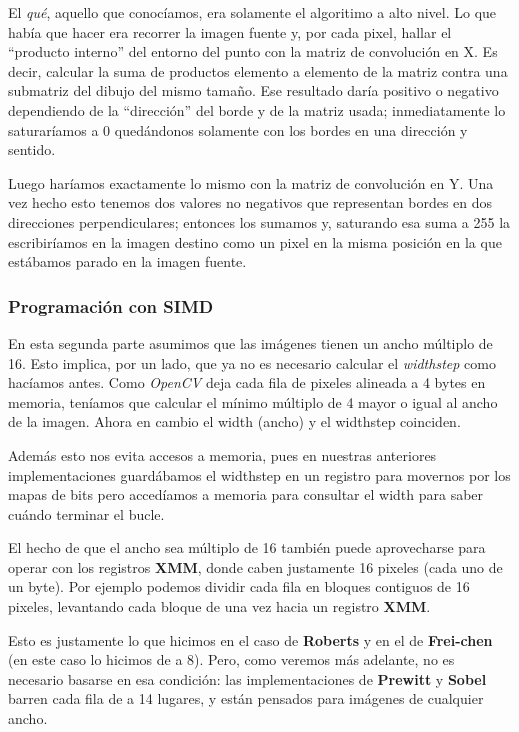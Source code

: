 El \emph{qué}, aquello que conocíamos, era solamente el algoritimo a alto nivel.
Lo que había que hacer era recorrer la imagen fuente y, por cada pixel, hallar el
``producto interno'' del entorno del punto con la matriz de convolución en X. Es
decir, calcular la suma de productos elemento a elemento de la matriz contra una
submatriz del dibujo del mismo tamaño. Ese resultado daría positivo o negativo
dependiendo de la ``dirección'' del borde y de la matriz usada; inmediatamente
lo saturaríamos a 0 quedándonos solamente con los bordes en una dirección y
sentido.

Luego haríamos exactamente lo mismo con la matriz de convolución en Y. Una vez
hecho esto tenemos dos valores no negativos que representan bordes en dos direcciones
perpendiculares; entonces los sumamos y, saturando esa suma a 255 la escribiríamos 
en la imagen destino como un pixel en la misma posición en la que estábamos parado
en la imagen fuente.


\subsubsection{Programación con SIMD}

En esta segunda parte asumimos que las imágenes tienen un ancho múltiplo de 16.
Esto implica, por un lado, que ya no es necesario calcular el \emph{widthstep}
como hacíamos antes. Como \emph{OpenCV} deja cada fila de pixeles alineada a 4
bytes en memoria, teníamos que calcular el mínimo múltiplo de 4 mayor o igual al
ancho de la imagen. Ahora en cambio el width (ancho) y el widthstep coinciden.

Además esto nos evita accesos a memoria, pues en nuestras anteriores implementaciones
	guardábamos el widthstep en un registro para movernos por los mapas de bits pero
accedíamos a memoria para consultar el width para saber cuándo terminar el bucle.

El hecho de que el ancho sea múltiplo de 16 también puede aprovecharse para operar
con los registros \textbf{XMM}, donde caben justamente 16 pixeles (cada uno de un byte).
Por ejemplo podemos dividir cada fila en bloques contiguos de 16 pixeles, levantando
cada bloque de una vez hacia un registro \textbf{XMM}.

Esto es justamente lo que hicimos en el caso de \textbf{Roberts} y en el de
\textbf{Frei-chen} (en este caso lo hicimos de a 8). Pero, como veremos más adelante,
no es necesario basarse en esa condición: las implementaciones de \textbf{Prewitt} y
\textbf{Sobel} barren cada fila de a 14 lugares, y están pensados para imágenes 
de cualquier ancho.

